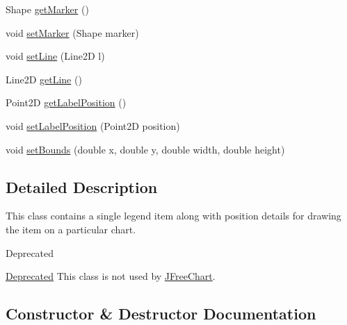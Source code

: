 \begin{DoxyCompactItemize}
\item 
Shape \mbox{\hyperlink{classorg_1_1jfree_1_1chart_1_1_drawable_legend_item_a2f262a9a74a94bcf3ee39aaa5ec224f3}{get\+Marker}} ()
\item 
void \mbox{\hyperlink{classorg_1_1jfree_1_1chart_1_1_drawable_legend_item_aef283072b6a798c91a45040ffc117e8c}{set\+Marker}} (Shape marker)
\item 
void \mbox{\hyperlink{classorg_1_1jfree_1_1chart_1_1_drawable_legend_item_a909e52520b79fd818515400a5bc3a57a}{set\+Line}} (Line2D l)
\item 
Line2D \mbox{\hyperlink{classorg_1_1jfree_1_1chart_1_1_drawable_legend_item_afb3b383ce596cfe2861564b90d5443eb}{get\+Line}} ()
\item 
Point2D \mbox{\hyperlink{classorg_1_1jfree_1_1chart_1_1_drawable_legend_item_a2ded171381be78d231cb0d7d64f9e544}{get\+Label\+Position}} ()
\item 
void \mbox{\hyperlink{classorg_1_1jfree_1_1chart_1_1_drawable_legend_item_a4c5c90e8cfc8bb50009472e9b5ea46e0}{set\+Label\+Position}} (Point2D position)
\item 
void \mbox{\hyperlink{classorg_1_1jfree_1_1chart_1_1_drawable_legend_item_a86175e5b7a11a4f7dda3fa94a6703114}{set\+Bounds}} (double x, double y, double width, double height)
\end{DoxyCompactItemize}


\subsection{Detailed Description}
This class contains a single legend item along with position details for drawing the item on a particular chart.

\begin{DoxyRefDesc}{Deprecated}
\item[\mbox{\hyperlink{deprecated__deprecated000034}{Deprecated}}]This class is not used by \mbox{\hyperlink{classorg_1_1jfree_1_1chart_1_1_j_free_chart}{J\+Free\+Chart}}. \end{DoxyRefDesc}


\subsection{Constructor \& Destructor Documentation}
\mbox{\label{classorg_1_1jfree_1_1chart_1_1_drawable_legend_item_a1bacedfcd4ffdbb2e044dfb3d1894f9f}} 
